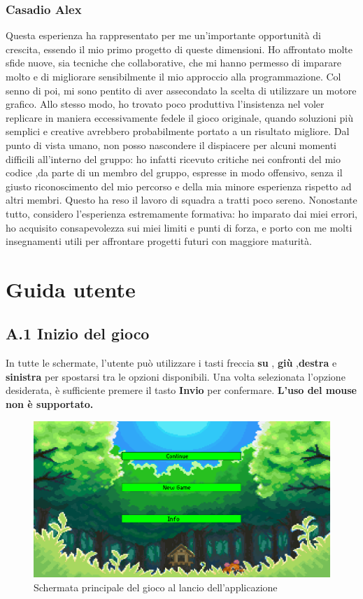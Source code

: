 \documentclass[a4paper,12pt]{report}
\begin{document}
{{\subsection{Casadio Alex}
Questa esperienza ha rappresentato per me un’importante opportunità di crescita, essendo il mio primo progetto di queste dimensioni. Ho affrontato molte sfide nuove, sia tecniche che collaborative, che mi hanno permesso di imparare molto e di migliorare sensibilmente il mio approccio alla programmazione.
Col senno di poi, mi sono pentito di aver assecondato la scelta di utilizzare un motore grafico. Allo stesso modo, ho trovato poco produttiva l’insistenza nel voler replicare in maniera eccessivamente fedele il gioco originale, quando soluzioni più semplici e creative avrebbero probabilmente portato a un risultato migliore.
Dal punto di vista umano, non posso nascondere il dispiacere per alcuni momenti difficili all’interno del gruppo: ho infatti ricevuto critiche nei confronti del mio codice ,da parte di un membro del gruppo, espresse in modo offensivo, senza il giusto riconoscimento del mio percorso e della mia minore esperienza rispetto ad altri membri. Questo ha reso il lavoro di squadra a tratti poco sereno.
Nonostante tutto, considero l’esperienza estremamente formativa: ho imparato dai miei errori, ho acquisito consapevolezza sui miei limiti e punti di forza, e porto con me molti insegnamenti utili per affrontare progetti futuri con maggiore maturità.

 
\appendix
\chapter{Guida utente}

\section*{A.1 Inizio del gioco}
In tutte le schermate, l’utente può utilizzare i tasti freccia \textbf{su} , \textbf{giù} ,\textbf{destra} e \textbf{sinistra} per spostarsi tra le opzioni disponibili.  
Una volta selezionata l’opzione desiderata, è sufficiente premere il tasto \textbf{Invio} per confermare.
\textbf{L’uso del mouse non è supportato.}
\begin{figure}[H]
  \centering
  \includegraphics[width=\textwidth]{immagini/scermataHome.png}
  \caption{Schermata principale del gioco al lancio dell'applicazione}
\end{figure}

}}
\end{document}
